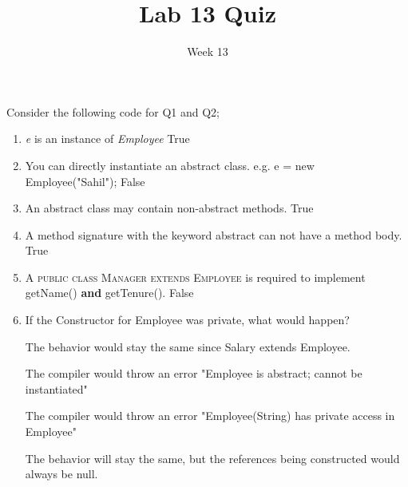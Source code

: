 \documentclass[addpoints]{exam}
\title{Lab 13 Quiz}
\date{Week 13}
\begin{document}
 

\Instructions
\hspace{0.5em}Consider the following code for Q1 and Q2;
\begin{enumerate}
\begin{lstlisting}
abstract class Employee {
	private String name;
	public Employee(String name) {
		this.name = name;
	}
	public String getName() {
	    return name;
	}
	public abstract int getTenure();
}
class Salary extends Employee {
	private int tenure;
	public Salary(String name, int tenure) {
		super(name);
		this.tenure = tenure;
	}
	public int getTenure() {
	    return this.tenure
	}
} 
public class AbstractTest {
	public static void main(String[] args) {
		Employee e = new Salary("Sahil", 999999);
	}
}
\end{lstlisting}
\item {} \tf  \textit{e} is an instance of \textit{Employee}
\newline
\Ans True
\item {} \tf  You can directly instantiate an abstract class. e.g. e = new Employee("Sahil");
\newline
\Ans False

\item {} \tf  An abstract class may contain non-abstract methods.
\newline
\Ans True
\item {} \tf  A method signature with the keyword abstract can not have a method body.
\newline
\Ans True
\item {} \tf  A \textsc{public class Manager extends Employee} is required to implement getName() \textbf{and} getTenure().
\newline
\Ans False
\item {}
If the Constructor for Employee was private, what would happen?

\begin{oneparchoices} 
\hspace{0.2cm}
 
 \choice  The behavior would stay the same since Salary extends Employee. \newline
 
 \choice The compiler would throw an error "Employee is abstract; cannot be instantiated" \newline
 
 \choice \Ans The compiler would throw an error "Employee(String) has private access in Employee"\newline
 
 \choice The behavior will stay the same, but the references being constructed would always be null. \newline
 \end{oneparchoices}




\vspace{2em}
\end{enumerate}
\end{document}
